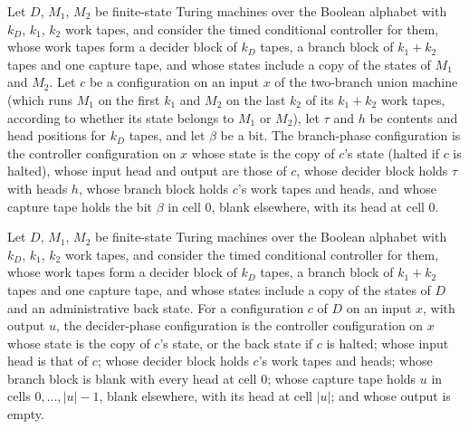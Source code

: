 \begin{definition}
\label{Turing.FinTM.timedBranchCfg}
\leanok
{}
Let $D$, $M_1$, $M_2$ be finite-state Turing machines over the Boolean alphabet with
$k_D$, $k_1$, $k_2$ work tapes, and consider the timed conditional controller for them,
whose work tapes form a decider block of $k_D$ tapes, a branch block of $k_1 + k_2$
tapes and one capture tape, and whose states include a copy of the states of $M_1$ and
$M_2$. Let $c$ be a configuration on an input $x$ of the two-branch union machine (which
runs $M_1$ on the first $k_1$ and $M_2$ on the last $k_2$ of its $k_1 + k_2$ work tapes,
according to whether its state belongs to $M_1$ or $M_2$), let $\tau$ and $h$ be
contents and head positions for $k_D$ tapes, and let $\beta$ be a bit. The branch-phase
configuration is the controller configuration on $x$ whose state is the copy of $c$'s
state (halted if $c$ is halted), whose input head and output are those of $c$, whose
decider block holds $\tau$ with heads $h$, whose branch block holds $c$'s work tapes and
heads, and whose capture tape holds the bit $\beta$ in cell $0$, blank elsewhere, with its
head at cell $0$.
\end{definition}

\begin{definition}
\label{Turing.FinTM.timedControlCfg}
\leanok
{}
Let $D$, $M_1$, $M_2$ be finite-state Turing machines over the Boolean alphabet with
$k_D$, $k_1$, $k_2$ work tapes, and consider the timed conditional controller for them,
whose work tapes form a decider block of $k_D$ tapes, a branch block of $k_1 + k_2$
tapes and one capture tape, and whose states include a copy of the states of $D$ and an
administrative back state. For a configuration $c$ of $D$ on an input $x$, with output
$u$, the decider-phase configuration is the controller configuration on $x$ whose state
is the copy of $c$'s state, or the back state if $c$ is halted; whose input head is that
of $c$; whose decider block holds $c$'s work tapes and heads; whose branch block is blank
with every head at cell $0$; whose capture tape holds $u$ in cells $0, \dots, |u|-1$,
blank elsewhere, with its head at cell $|u|$; and whose output is empty.
\end{definition}

